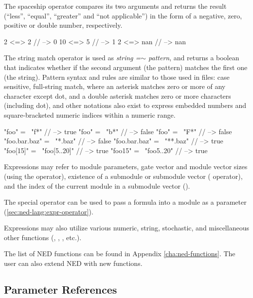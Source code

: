 The spaceship operator \ttt{<=>} compares its two arguments and returns the
result (``less'', ``equal'', ``greater'' and ``not applicable'') in the form of
a negative, zero, positive or  double number, respectively.

\begin{ned}
    2 <=> 2  // --> 0
    10 <=> 5  // --> 1
    2 <=> nan // --> nan
\end{ned}

The string match operator \ttt{=\ensuremath{\sim}} is used as \textit{string
=\ensuremath{\sim} pattern}, and returns a boolean that indicates whether if the
second argument (the pattern) matches the first one (the string). Pattern syntax
and rules are similar to those used in  files: case
sensitive, full-string match, where an asterisk \ttt{*} matches zero or more of
any character except dot, and a double asterisk \ttt{**} matches zero or more
characters (including dot), and other notations also exist to express embedded
numbers and square-bracketed numeric indices within a numeric range.

\begin{ned}
    "foo" =~ "f*" // --> true
    "foo" =~ "b*" // --> false
    "foo" =~ "F*" // --> false
    "foo.bar.baz" =~ "*.baz" // --> false
    "foo.bar.baz" =~ "**.baz" // --> true
    "foo[15]" =~ "foo[5..20]" // --> true
    "foo15" =~ "foo{5..20}" // --> true
\end{ned}

Expressions may refer to module parameters, gate vector and module vector sizes
(using the  operator), existence of a submodule or submodule
vector ( operator), and the index of the current module in a
submodule vector ().

The special operator  can be used to pass a formula into a
module as a parameter (\ref{sec:ned-lang:expr-operator}).

Expressions may also utilize various numeric, string, stochastic, and
miscellaneous other functions (, , ,
etc.).

\begin{note}
    The list of NED functions can be found in Appendix \ref{cha:ned-functions}.
    The user can also extend NED with new functions.
\end{note}


\subsection{Parameter References}
\label{sec:ned-lang:parameter-references}

